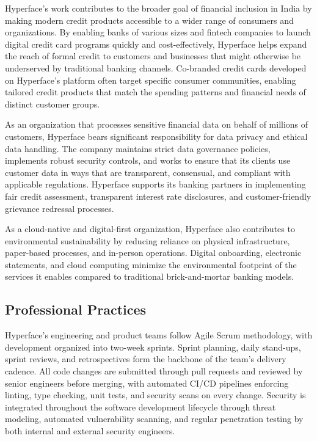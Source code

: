 Hyperface's work contributes to the broader goal of financial inclusion in India by making modern credit products accessible to a wider range of consumers and organizations. By enabling banks of various sizes and fintech companies to launch digital credit card programs quickly and cost-effectively, Hyperface helps expand the reach of formal credit to customers and businesses that might otherwise be underserved by traditional banking channels. Co-branded credit cards developed on Hyperface's platform often target specific consumer communities, enabling tailored credit products that match the spending patterns and financial needs of distinct customer groups.

As an organization that processes sensitive financial data on behalf of millions of customers, Hyperface bears significant responsibility for data privacy and ethical data handling. The company maintains strict data governance policies, implements robust security controls, and works to ensure that its clients use customer data in ways that are transparent, consensual, and compliant with applicable regulations. Hyperface supports its banking partners in implementing fair credit assessment, transparent interest rate disclosures, and customer-friendly grievance redressal processes.

As a cloud-native and digital-first organization, Hyperface also contributes to environmental sustainability by reducing reliance on physical infrastructure, paper-based processes, and in-person operations. Digital onboarding, electronic statements, and cloud computing minimize the environmental footprint of the services it enables compared to traditional brick-and-mortar banking models.

\subsection{Professional Practices}

Hyperface's engineering and product teams follow Agile Scrum methodology, with development organized into two-week sprints. Sprint planning, daily stand-ups, sprint reviews, and retrospectives form the backbone of the team's delivery cadence. All code changes are submitted through pull requests and reviewed by senior engineers before merging, with automated CI/CD pipelines enforcing linting, type checking, unit tests, and security scans on every change. Security is integrated throughout the software development lifecycle through threat modeling, automated vulnerability scanning, and regular penetration testing by both internal and external security engineers.

